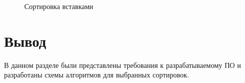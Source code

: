 \begin{figure}
	\caption{Сортировка вставками}
\end{figure}

\newpage
\section{Вывод}
В данном разделе были представлены требования к разрабатываемому ПО и разработаны схемы алгоритмов для выбранных сортировок.